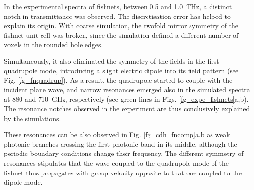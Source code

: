 In the experimental spectra of fishnets,  between 0.5 and 1.0~THz, a distinct notch in transmittance was observed. The discretisation error has helped to explain its origin. With coarse simulation, the twofold mirror symmetry of the fishnet unit cell was broken, since the simulation defined a different number of voxels in the rounded hole edges. 

Simultaneously, it also eliminated the symmetry of the fields in the first quadrupole mode, introducing a slight electric dipole into its field pattern (see Fig. \ref{fg_fnquadrup}). As a result, the quadrupole started to couple with the incident plane wave, and narrow resonances emerged also in the simulated spectra at 880 and 710~GHz, respectively (see green lines in Figs. \ref{fg_expe_fishnets}a,b). The resonance notches observed in the experiment are thus conclusively explained by the simulations. %

These resonances can be also observed in Fig. \ref{fg_cdh_fncomp}a,b as weak photonic branches crossing the first photonic band in its middle, although the periodic boundary conditions change their frequency. The different symmetry of resonances stipulates that the wave coupled to the quadrupole mode of the fishnet thus propagates with group velocity  opposite to that one coupled to the dipole mode.


